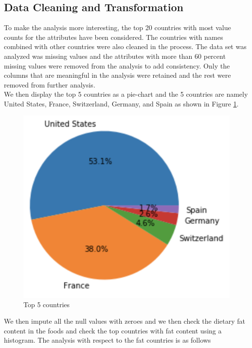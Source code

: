 \documentclass[sigconf]{acmart}
\begin{document}
\subsection{Data Cleaning and Transformation}
To make the analysis more interesting, the top 20 countries with most value counts for the attributes have been considered. The countries with names combined with other countries were also cleaned in the process. The data set was analyzed was missing values and the attributes with more than 60 percent missing values were removed from the analysis to add consistency. Only the columns that are meaningful in the analysis were retained and the rest were removed from further analysis. \\

We then display the top 5 countries as a pie-chart and the 5 countries are namely United States, France, Switzerland, Germany, and Spain as shown in Figure \ref{fig:Fig7}. 

\begin{figure}
\includegraphics[width=1.0\textwidth]{images/fig7.png}
\caption{Top 5 countries \cite{code-base}}
\label{fig:Fig7}
\end{figure}

We then impute all the null values with zeroes and we then check the dietary fat content in the foods and check the top countries with fat content using a histogram. The analysis with respect to the fat countries is as follows \\
\end{document}
